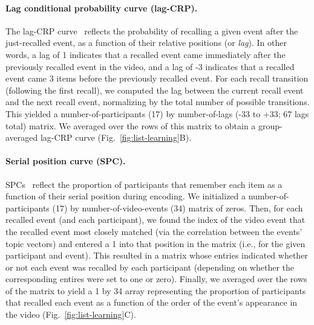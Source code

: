 \documentclass{article}
\begin{document}
\paragraph{Lag conditional probability curve (lag-CRP).} The lag-CRP curve~\citep{Kaha96} reflects the probability of recalling a given event after the just-recalled event, as a function of their relative positions (or \textit{lag}).  In other words, a lag of 1 indicates that a recalled event came immediately after the previously recalled event in the video, and a lag of -3 indicates that a recalled event came 3 items before the previously recalled event.  For each recall transition (following the first recall), we computed the lag between the current recall event and the next recall event, normalizing by the total number of possible transitions.  This yielded a number-of-participants (17) by number-of-lags (-33 to +33; 67 lags total) matrix. We averaged over the rows of this matrix to obtain a group-averaged lag-CRP curve (Fig.~\ref{fig:list-learning}B).

\paragraph{Serial position curve (SPC).} SPCs~\citep{Murd62a} reflect the proportion of participants that remember each item as a function of their serial position during encoding. We initialized a number-of-participants (17) by number-of-video-events (34) matrix of zeros. Then, for each recalled event (and each participant), we found the index of the video event that the recalled event most closely matched (via the correlation between the events' topic vectors) and entered a 1 into that position in the matrix (i.e., for the given participant and event). This resulted in a matrix whose entries indicated whether or not each event was recalled by each participant (depending on whether the corresponding entires were set to one or zero).  Finally, we averaged over the rows of the matrix to yield a 1 by 34 array representing the proportion of participants that recalled each event as a function of the order of the event's appearance in the video (Fig.~\ref{fig:list-learning}C).
\end{document}
